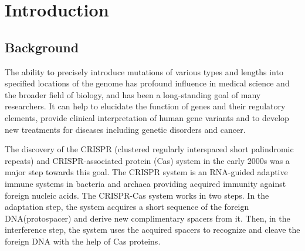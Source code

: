 \chapter{Introduction}

\section{Background}


The ability to precisely introduce mutations of various types and lengths into specified locations of the genome has profound influence in medical science and the broader field of biology, and has been a long-standing goal of many researchers. It can help to elucidate the function of genes and their regulatory elements, provide clinical interpretation of human gene variants and to develop new treatments for diseases including genetic disorders and cancer\cite{petraityteGenomeEditingMedicine2021,dasCRISPRBasedTherapeutics2022,portoBaseEditingAdvances2020}. 

The discovery of the CRISPR (clustered regularly interspaced short palindromic repeats) and CRISPR-associated protein (Cas) system in the early 2000s was a major step towards this goal. The CRISPR system is an RNA-guided adaptive immune systems in bacteria and archaea providing acquired immunity against foreign nucleic acids\cite{jiangCRISPRCas9Structures2017}. The CRISPR-Cas system works in two steps. In the adaptation step, the system acquires a short sequence of the foreign DNA(protospacer) and derive new complimentary spacers from it. Then, in the interference step, the system uses the acquired spacers to recognize and cleave the foreign DNA with the help of Cas proteins\cite{garneauCRISPRCasBacterial2010}. 

